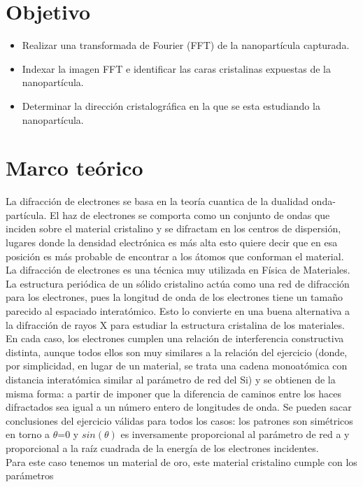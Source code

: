 \documentclass[reprint,amsmath,amssymb,aps,]{revtex4-2}
\begin{document}
\section{Objetivo}
\begin{itemize}
    \item Realizar una transformada de Fourier (FFT) de la nanopartícula capturada.
    \item Indexar la imagen FFT e identificar las caras cristalinas expuestas de la nanopartícula.
    \item Determinar la dirección cristalográfica en la que se esta estudiando la nanopartícula.
\end{itemize}
\vspace{-0.7cm}
\section{Marco teórico}
La difracción de electrones se basa en la teoría cuantica de la dualidad onda-partícula. El haz de electrones se comporta como un conjunto
de ondas que inciden sobre el material cristalino y se difractam en los centros de dispersión, lugares donde la densidad electrónica es más alta
esto quiere decir que en esa posición es más probable de encontrar a los átomos que conforman el material.\\ 
La difracción de electrones es una técnica muy utilizada en Física de Materiales. La estructura periódica
de un sólido cristalino actúa como una red de difracción para los electrones, pues la longitud de onda de
los electrones tiene un tamaño parecido al espaciado interatómico. Esto lo convierte en una buena
alternativa a la difracción de rayos X para
estudiar la estructura cristalina de los
materiales. En cada caso, los electrones cumplen una relación de interferencia constructiva distinta, aunque todos
ellos son muy similares a la relación del ejercicio (donde, por simplicidad, en lugar de un material, se
trata una cadena monoatómica con distancia interatómica similar al parámetro de red del Si) y se
obtienen de la misma forma: a partir de imponer que la diferencia de caminos entre los haces
difractados sea igual a un número entero de longitudes de onda. Se pueden sacar conclusiones del
ejercicio válidas para todos los casos: los patrones son simétricos en torno a $\theta$=0 y $sin(\theta)$ es
inversamente proporcional al parámetro de red a y proporcional a la raíz cuadrada de la energía de los
electrones incidentes.\\
Para este caso tenemos un material de oro, este material cristalino cumple con los parámetros 
\end{document}
